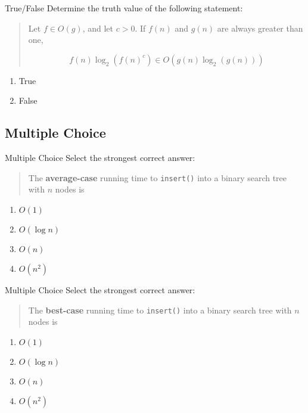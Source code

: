 \documentclass[9pt]{beamer}
\begin{document}
\begin{frame}[fragile]{True/False}
  Determine the truth value of the following statement:

  \begin{quote}
    Let $f\in O(g)$, and let $c>0$. If $f(n)$ and $g(n)$ are always greater
    than one,

    \[f(n)\log_2{(f(n)^c)} \in O(g(n)\log_2{(g(n))})\]
  \end{quote}

  \begin{enumerate}
    \item
      \alert<2->{True}
    \item
      False
  \end{enumerate}

\end{frame}

\subsection{Multiple Choice}
\begin{frame}[fragile]{Multiple Choice}
  Select the strongest correct answer:

  \begin{quote}
    The {\bf average-case} running time to {\tt insert()} into a binary
    search tree with $n$ nodes is
  \end{quote}

  \begin{enumerate}
    \item
      $O(1)$
    \item
      \alert<2>{$O(\log{n})$}
    \item
      $O(n)$
    \item
      $O(n^2)$
  \end{enumerate}
\end{frame}

\begin{frame}[fragile]{Multiple Choice}
  Select the strongest correct answer:

  \begin{quote}
    The {\bf best-case} running time to {\tt insert()} into a binary search
    tree with $n$ nodes is
  \end{quote}

  \begin{enumerate}
    \item
      \alert<2>{$O(1)$}
    \item
      $O(\log{n})$
    \item
      $O(n)$
    \item
      $O(n^2)$
  \end{enumerate}
\end{frame}
\end{document}
